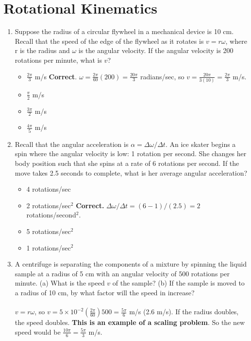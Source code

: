 \documentclass[10pt]{article}
\begin{document}
\maketitle

\section{Rotational Kinematics}
\begin{enumerate}
\item Suppose the radius of a circular flywheel in a mechanical device is 10 cm.  Recall that the speed of the edge of the flywheel as it rotates is $v = r\omega$, where r is the radius and $\omega$ is the angular velocity.  If the angular velocity is 200 rotations per minute, what is $v$?
\begin{itemize}
\item $\frac{2\pi}{3}$ m/s \textbf{Correct}.  $\omega = \frac{2\pi}{60}(200) = \frac{20\pi}{3}$ radians/sec, so $v = \frac{20\pi}{3(10)} = \frac{2\pi}{3}$ m/s.
\item $\frac{\pi}{2}$ m/s
\item $\frac{3\pi}{2}$ m/s
\item $\frac{4\pi}{5}$ m/s
\end{itemize}
\item Recall that the angular acceleration is $\alpha = \Delta \omega/\Delta t$.  An ice skater begins a spin where the angular velocity is low: 1 rotation per second.  She changes her body position such that she spins at a rate of 6 rotations per second.  If the move takes 2.5 seconds to complete, what is her average angular acceleration?
\begin{itemize}
\item 4 rotations/sec
\item 2 rotations/sec$^2$ \textbf{Correct.} $\Delta\omega/\Delta t = (6-1)/(2.5) = 2$ rotations/second$^2$.
\item 5 rotations/sec$^2$
\item 1 rotations/sec$^2$
\end{itemize}
\item A centrifuge is separating the components of a mixture by spinning the liquid sample at a radius of 5 cm with an angular velocity of 500 rotations per minute.  (a) What is the speed $v$ of the sample?  (b) If the sample is moved to a radius of 10 cm, by what factor will the speed in increase? \\ \\
$v = r\omega$, so $v = 5\times 10^{-2} \left(\frac{2\pi}{60}\right) 500 = \frac{5\pi}{6}$ m/s (2.6 m/s).  If the radius doubles, the speed doubles.  \textbf{This is an example of a scaling problem}.  So the new speed would be $\frac{10\pi}{6} = \frac{5\pi}{3}$ m/s.
\end{enumerate}
\end{document}
